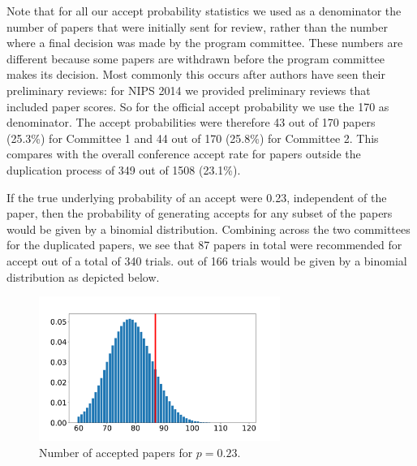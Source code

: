 Note that for all our accept probability statistics we used as a
denominator the number of papers that were initially sent for review,
rather than the number where a final decision was made by the program
committee. These numbers are different because some papers are withdrawn
before the program committee makes its decision. Most commonly this
occurs after authors have seen their preliminary reviews: for NIPS 2014
we provided preliminary reviews that included paper scores. So for the
official accept probability we use the 170 as denominator. The accept
probabilities were therefore 43 out of 170 papers (25.3\%) for Committee
1 and 44 out of 170 (25.8\%) for Committee 2. This compares with the
overall conference accept rate for papers outside the duplication
process of 349 out of 1508 (23.1\%).

If the true underlying probability of an accept were 0.23, independent
of the paper, then the probability of generating accepts for any subset
of the papers would be given by a binomial distribution. Combining
across the two committees for the duplicated papers, we see that 87
papers in total were recommended for accept out of a total of 340
trials. out of 166 trials would be given by a binomial distribution as
depicted below.

\begin{Shaded}
\begin{Highlighting}[]
\end{Highlighting}
\end{Shaded}

\begin{figure}[htb]
\includegraphics[width=0.70\textwidth]{diagrams/neurips/uncertainty-accept-rate.pdf}


\caption{Number of accepted papers for $p=0.23$.}
\label{uncertainty-accept-rate}
\end{figure}

